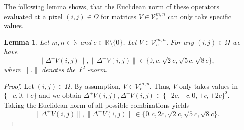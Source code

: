 \documentclass[a4paper,12pt]{article}
\newcommand{\norm}[1]{\lVert#1\rVert}
\theoremstyle{plain}
\newtheorem{lemma}[theorem]{Lemma}
\theoremstyle{definition}
\numberwithin{equation}{section}
\begin{document}
The following lemma shows, that the Euclidean norm of these operators evaluated at a pixel $(i, j) \in \Omega$ for matrices $V \in \mathcal{V}_c^{m, n}$ can only take specific values.

\begin{lemma}\label{lem: setD}
	Let $m, n \in \mathbb{N}$ and $c \in \mathbb{R} \setminus \{ 0 \}$. Let $V \in \mathcal{V}_c^{m, n}$. For any $(i, j) \in \Omega$ we have
	\begin{equation}
		\norm{\Delta^+ V(i, j)}, \norm{\Delta^- V(i, j)} \in \{ 0, c, \sqrt{2} c, \sqrt{5} c, \sqrt{8} c \},
	\end{equation}
	where $\norm{.}$ denotes the $\ell^2$-norm.
\end{lemma}
\begin{proof}
	Let $(i, j) \in \Omega$. By assumption, $V \in \mathcal{V}_c^{m, n}$. Thus, $V$ only takes values in $\{ -c, 0, + c \}$ and we obtain $\Delta^+ V(i, j), \Delta^- V(i, j) \in \{ - 2 c, - c, 0, + c, + 2 c \}^2$. Taking the Euclidean norm of all possible combinations yields
	\begin{equation*}
		\norm{\Delta^+ V(i, j)}, \norm{\Delta^- V(i, j)} \in \{ 0, c, 2 c, \sqrt{2} c, \sqrt{5} c, \sqrt{8} c \}.
	\end{equation*}
	

\end{proof}
\end{document}
